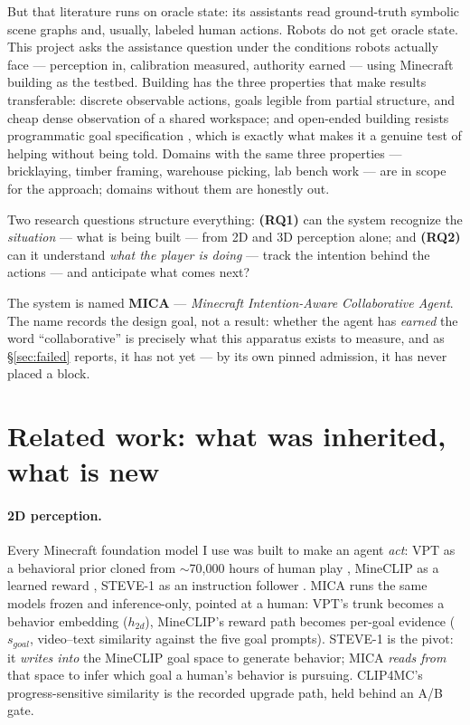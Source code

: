 \documentclass[11pt]{article}
\begin{document}
But that literature runs on oracle state: its assistants read ground-truth
symbolic scene graphs and, usually, labeled human actions. Robots do not get
oracle state. This project asks the assistance question under the conditions
robots actually face --- perception in, calibration measured, authority earned
--- using Minecraft building as the testbed. Building has the three properties
that make results transferable: discrete observable actions, goals legible from
partial structure, and cheap dense observation of a shared workspace; and
open-ended building resists programmatic goal specification \cite{bedd}, which
is exactly what makes it a genuine test of helping without being told. Domains
with the same three properties --- bricklaying, timber framing, warehouse
picking, lab bench work --- are in scope for the approach; domains without
them are honestly out.

Two research questions structure everything:
\textbf{(RQ1)} can the system recognize the \emph{situation} --- what is being
built --- from 2D and 3D perception alone; and
\textbf{(RQ2)} can it understand \emph{what the player is doing} --- track the
intention behind the actions --- and anticipate what comes next?

The system is named \textbf{MICA} --- \emph{Minecraft Intention-Aware
Collaborative Agent}. The name records the design goal, not a result: whether
the agent has \emph{earned} the word ``collaborative'' is precisely what this
apparatus exists to measure, and as \S\ref{sec:failed} reports, it has not
yet --- by its own pinned admission, it has never placed a block.

\section{Related work: what was inherited, what is new}

\paragraph{2D perception.} Every Minecraft foundation model I use was built to
make an agent \emph{act}: VPT as a behavioral prior cloned from $\sim$70{,}000
hours of human play \cite{vpt}, MineCLIP as a learned reward \cite{minedojo},
STEVE-1 as an instruction follower \cite{steve1}. MICA runs the same models
frozen and inference-only, pointed at a human: VPT's trunk becomes a behavior
embedding ($h_{2d}$), MineCLIP's reward path becomes per-goal evidence
($s_{goal}$, video--text similarity against the five goal prompts). STEVE-1 is
the pivot: it \emph{writes into} the MineCLIP goal space to generate behavior;
MICA \emph{reads from} that space to infer which goal a human's behavior is
pursuing. CLIP4MC's progress-sensitive similarity \cite{clip4mc} is the
recorded upgrade path, held behind an A/B gate.
\end{document}
